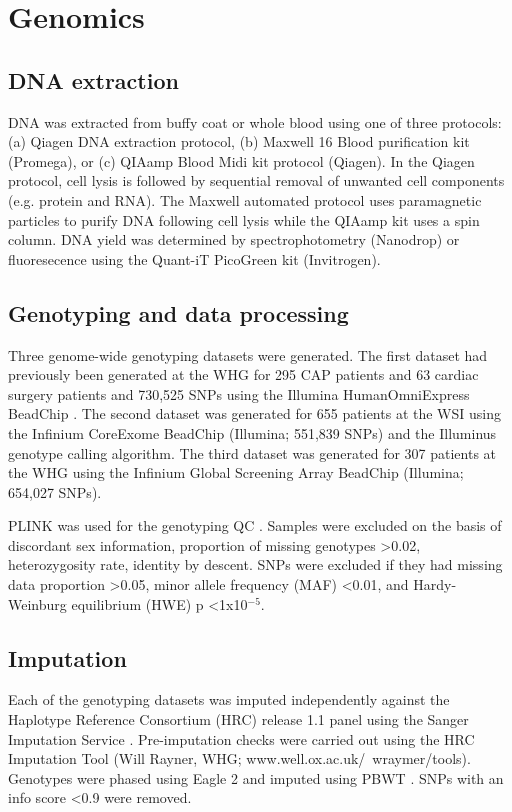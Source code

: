 \section{Genomics}
\subsection{DNA extraction}
DNA was extracted from buffy coat or whole blood using one of three protocols: (a) Qiagen DNA extraction protocol, (b) Maxwell 16 Blood purification kit (Promega), or (c) QIAamp Blood Midi kit protocol (Qiagen). In the Qiagen protocol, cell lysis is followed by sequential removal of unwanted cell components (e.g. protein and RNA). The Maxwell automated protocol uses paramagnetic particles to purify DNA following cell lysis while the QIAamp kit uses a spin column. DNA yield was determined by spectrophotometry (Nanodrop) or fluoresecence using the Quant-iT PicoGreen kit (Invitrogen). 

\subsection{Genotyping and data processing}
Three genome-wide genotyping datasets were generated. The first dataset had previously been generated at the WHG for 295 CAP patients and 63 cardiac surgery patients and 730,525 SNPs using the Illumina HumanOmniExpress BeadChip \parencite{Davenport2014}. The second dataset was generated for 655 patients at the WSI using the Infinium CoreExome BeadChip (Illumina; 551,839 SNPs) and the Illuminus genotype calling algorithm. The third dataset was generated for 307 patients at the WHG using the Infinium Global Screening Array BeadChip (Illumina; 654,027 SNPs).

PLINK was used for the genotyping QC \parencite{Anderson2010}. Samples were excluded on the basis of discordant sex information, proportion of missing genotypes \textgreater 0.02, heterozygosity rate, identity by descent. SNPs were excluded if they had missing data proportion \textgreater 0.05, minor allele frequency (MAF) \textless 0.01, and Hardy-Weinburg equilibrium (HWE) p \textless 1x10$^{-5}$.

\subsection{Imputation}
Each of the genotyping datasets was imputed independently against the Haplotype Reference Consortium (HRC) release 1.1 panel using the Sanger Imputation Service \parencite{McCarthy2016}. Pre-imputation checks were carried out using the HRC Imputation Tool (Will Rayner, WHG; www.well.ox.ac.uk/~wraymer/tools). Genotypes were phased using Eagle 2 \parencite{Loh2016} and imputed using PBWT \parencite{Durbin2014}. SNPs with an info score \textless 0.9 were removed. 

